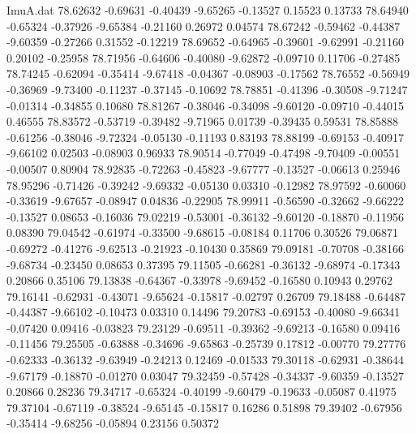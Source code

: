 \begin{filecontents}{ImuA.dat}
  78.62632   -0.69631   -0.40439   -9.65265   -0.13527    0.15523    0.13733
  78.64940   -0.65324   -0.37926   -9.65384   -0.21160    0.26972    0.04574
  78.67242   -0.59462   -0.44387   -9.60359   -0.27266    0.31552   -0.12219
  78.69652   -0.64965   -0.39601   -9.62991   -0.21160    0.20102   -0.25958
  78.71956   -0.64606   -0.40080   -9.62872   -0.09710    0.11706   -0.27485
  78.74245   -0.62094   -0.35414   -9.67418   -0.04367   -0.08903   -0.17562
  78.76552   -0.56949   -0.36969   -9.73400   -0.11237   -0.37145   -0.10692
  78.78851   -0.41396   -0.30508   -9.71247   -0.01314   -0.34855    0.10680
  78.81267   -0.38046   -0.34098   -9.60120   -0.09710   -0.44015    0.46555
  78.83572   -0.53719   -0.39482   -9.71965    0.01739   -0.39435    0.59531
  78.85888   -0.61256   -0.38046   -9.72324   -0.05130   -0.11193    0.83193
  78.88199   -0.69153   -0.40917   -9.66102    0.02503   -0.08903    0.96933
  78.90514   -0.77049   -0.47498   -9.70409   -0.00551   -0.00507    0.80904
  78.92835   -0.72263   -0.45823   -9.67777   -0.13527   -0.06613    0.25946
  78.95296   -0.71426   -0.39242   -9.69332   -0.05130    0.03310   -0.12982
  78.97592   -0.60060   -0.33619   -9.67657   -0.08947    0.04836   -0.22905
  78.99911   -0.56590   -0.32662   -9.66222   -0.13527    0.08653   -0.16036
  79.02219   -0.53001   -0.36132   -9.60120   -0.18870   -0.11956    0.08390
  79.04542   -0.61974   -0.33500   -9.68615   -0.08184    0.11706    0.30526
  79.06871   -0.69272   -0.41276   -9.62513   -0.21923   -0.10430    0.35869
  79.09181   -0.70708   -0.38166   -9.68734   -0.23450    0.08653    0.37395
  79.11505   -0.66281   -0.36132   -9.68974   -0.17343    0.20866    0.35106
  79.13838   -0.64367   -0.33978   -9.69452   -0.16580    0.10943    0.29762
  79.16141   -0.62931   -0.43071   -9.65624   -0.15817   -0.02797    0.26709
  79.18488   -0.64487   -0.44387   -9.66102   -0.10473    0.03310    0.14496
  79.20783   -0.69153   -0.40080   -9.66341   -0.07420    0.09416   -0.03823
  79.23129   -0.69511   -0.39362   -9.69213   -0.16580    0.09416   -0.11456
  79.25505   -0.63888   -0.34696   -9.65863   -0.25739    0.17812   -0.00770
  79.27776   -0.62333   -0.36132   -9.63949   -0.24213    0.12469   -0.01533
  79.30118   -0.62931   -0.38644   -9.67179   -0.18870   -0.01270    0.03047
  79.32459   -0.57428   -0.34337   -9.60359   -0.13527    0.20866    0.28236
  79.34717   -0.65324   -0.40199   -9.60479   -0.19633   -0.05087    0.41975
  79.37104   -0.67119   -0.38524   -9.65145   -0.15817    0.16286    0.51898
  79.39402   -0.67956   -0.35414   -9.68256   -0.05894    0.23156    0.50372

\end{filecontents}
